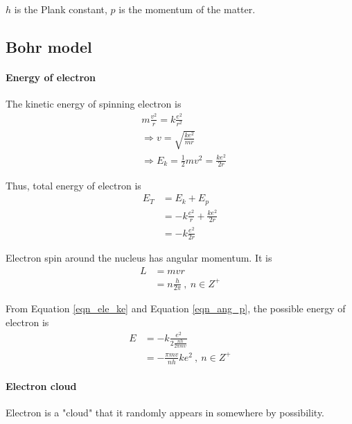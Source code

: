             $h$ is the Plank constant, $p$ is the momentum of the matter.

    \subsection{Bohr model}
        \paragraph{Energy of electron}
            The kinetic energy of spinning electron is
            \begin{align}
                & m \frac{v^2}{r} = k \frac{e^2}{r^2} \\
                & \Rightarrow v = \sqrt{\frac{k e^2}{m r}} \\
                & \Rightarrow E_k = \frac{1}{2} m v^2 = \frac{k e^2}{2 r}
            \end{align}

            Thus, total energy of electron is
            \begin{align}
                E_T &= E_k + E_p  \\
                    &= - k \frac{e^2}{r} + \frac{k e^2}{2 r} \\
                    &= -k \frac{e^2}{2 r}
                \label{eqn_ele_ke}
            \end{align}

            Electron spin around the nucleus has angular momentum. It is
            \begin{align}
                L &= m v r \\ 
                  &=n \frac{h}{2 \pi}\ , \ n \in Z^+
                \label{eqn_ang_p}
            \end{align}

            From Equation \ref{eqn_ele_ke} and Equation \ref{eqn_ang_p}, the possible energy of electron is
            \begin{align}
                E &= -k \frac{e^2}{2 \frac{n h}{2 \pi m v}} \\
                  &= - \frac{\pi m v }{n h} k e^2\ , \ n \in Z^+
            \end{align}
        
        \paragraph{Electron cloud}
            Electron is a "cloud" that it randomly appears in somewhere by possibility. 

